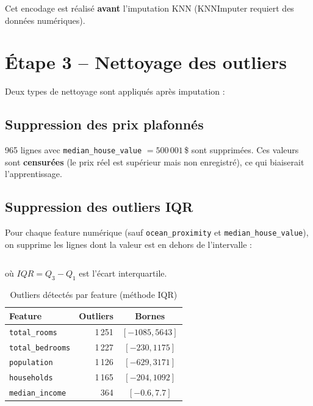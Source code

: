 \documentclass[a4paper,11pt]{article}
\begin{document}
Cet encodage est r\'ealis\'e \textbf{avant} l'imputation KNN (KNNImputer requiert des donn\'ees num\'eriques).

\section{\'Etape 3 -- Nettoyage des outliers}

Deux types de nettoyage sont appliqu\'es apr\`es imputation :

\subsection{Suppression des prix plafonn\'es}

965 lignes avec \texttt{median\_house\_value} $= 500\,001$\,\$ sont supprim\'ees. Ces valeurs sont \textbf{censur\'ees} (le prix r\'eel est sup\'erieur mais non enregistr\'e), ce qui biaiserait l'apprentissage.

\subsection{Suppression des outliers IQR}

Pour chaque feature num\'erique (sauf \texttt{ocean\_proximity} et \texttt{median\_house\_value}), on supprime les lignes dont la valeur est en dehors de l'intervalle :

\begin{equation}
[Q_1 - 1.5 \times IQR,\; Q_3 + 1.5 \times IQR]
\end{equation}

o\`u $IQR = Q_3 - Q_1$ est l'\'ecart interquartile.

\begin{table}[h]
\centering
\begin{tabular}{lrc}
\toprule
\textbf{Feature} & \textbf{Outliers} & \textbf{Bornes} \\
\midrule
\texttt{total\_rooms}    & 1\,251 & $[-1085, 5643]$ \\
\texttt{total\_bedrooms} & 1\,227 & $[-230, 1175]$ \\
\texttt{population}      & 1\,126 & $[-629, 3171]$ \\
\texttt{households}      & 1\,165 & $[-204, 1092]$ \\
\texttt{median\_income}  & 364    & $[-0.6, 7.7]$ \\
\bottomrule
\end{tabular}
\caption{Outliers d\'etect\'es par feature (m\'ethode IQR)}
\end{table}
\end{document}
